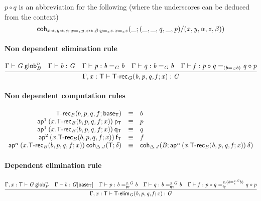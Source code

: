 $p\circ q$ is an abbreviation for the following (where the underscores can be
deduced from the context)
\[\mathsf{coh}_{x:\mathord{*},y:\mathord{*},\alpha:x =_{\mathord{*}} y,z:\mathord{*},
  \beta:y =_{\mathord{*}} z.x =_{\mathord{*}} z} \mathit{(\_;(\_,\_,q,\_,p)/(x,y,\alpha,z,\beta))}\]

\paragraph{Non dependent elimination rule}

\[
\infer{\ofglob{\Gamma,x:\dsd{T}}{\dsd{T\text{-}rec}_G(b, p, q, f; x)}{G}}
{\wfglob{\Gamma}{G}{n}{B} &
  \ofglob{\Gamma}{b}{G} &
  \ofglob{\Gamma}{p}{\homj{G}{b}{b}} &
  \ofglob{\Gamma}{q}{\homj{G}{b}{b}} &
  \ofglob{\Gamma}{f}{\homj{(\homj{G}{b}{b})}{p\circ q}{q \circ p}}}
\]

\paragraph{Non dependent computation rules}

\[
\begin{array}{rcl}
\mathsf{T\text{-}rec}_{B}(b, p, q, f; \mathsf{base_T}) & \equiv & b \\
\mathsf{ap}^{1} \: {(x.\mathsf{T\text{-}rec}_{B}(b, p, q, f; x))} \: {\mathsf{p_T}} & \equiv & p\\
\mathsf{ap}^{1} \: {(x.\mathsf{T\text{-}rec}_{B}(b, p, q, f; x))} \: {\mathsf{q_T}} & \equiv & q\\
\mathsf{ap}^{2} \: {(x.\mathsf{T\text{-}rec}_{B}(b, p, q, f; x))} \: {\mathsf{f_T}} & \equiv & f\\
\mathsf{ap}^{n} \: {(x.\mathsf{T\text{-}rec}_{B}(b, p, q, f; x))} \: {\mathsf{coh}_{\Delta.J} \mathit{(\mathsf{T};\delta)}} & \equiv &
\mathsf{coh}_{\Delta.J} \mathit{(B;\mathsf{ap}^{n} \: {(x.\mathsf{T\text{-}rec}_{B}(b, p, q, f; x))} \: {\delta})}
\end{array}
\]

\paragraph{Dependent elimination rule}

\[
\infer{\ofglob{\Gamma,x:\dsd{T}}{\dsd{T\text{-}elim}_G(b, p, q, f; x)}{G}}
{\wfglob{\Gamma,x:\dsd{T}}{G}{n}{P} &
  \ofglob{\Gamma}{b}{G[\baseT]} &
  \ofglob{\Gamma}{p}{\dhomj{x.G}{b}{b}{\pT}} &
  \ofglob{\Gamma}{q}{\dhomj{x.G}{b}{b}{\qT}} &
  \ofglob{\Gamma}{f}{\dhomj{x.(\dhomj{y.G}{b}{b}{x})}{p\circ q}{q \circ p}
    {\fT}}}
\]


